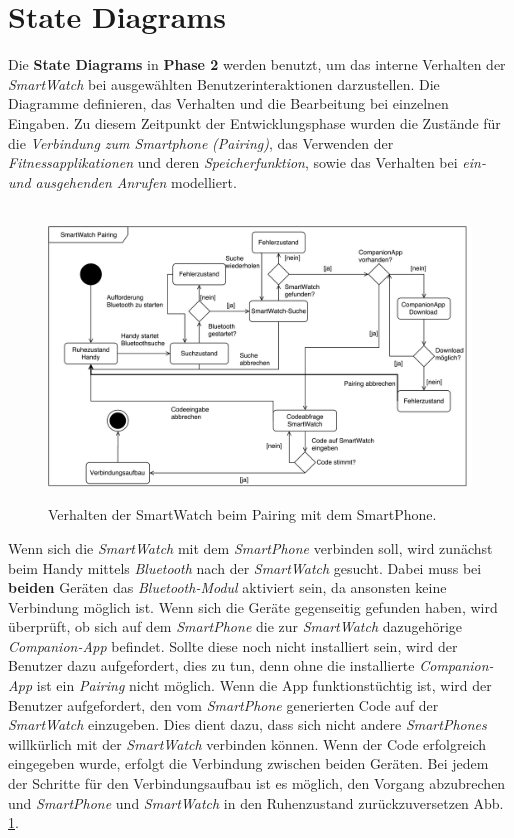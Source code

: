 \section{State Diagrams}
Die \textbf{State Diagrams} in \textbf{Phase 2} werden benutzt, um das interne Verhalten der \textit{SmartWatch} bei ausgewählten Benutzerinteraktionen darzustellen. Die Diagramme definieren, das Verhalten und die Bearbeitung bei einzelnen Eingaben. Zu diesem Zeitpunkt der Entwicklungsphase wurden die Zustände für die \textit{Verbindung zum Smartphone} \textit{(Pairing)}, das Verwenden der \textit{Fitnessapplikationen} und deren \textit{Speicherfunktion}, sowie das Verhalten bei \textit{ein- und ausgehenden Anrufen} modelliert.\\
\begin{figure}[h]
\centering\
\includegraphics[width=\textwidth]{img/statePairing}
\caption[State Diagram: Pairing]{Verhalten der SmartWatch beim Pairing mit dem SmartPhone.}
\label{fig:statePairing}
\end{figure}
Wenn sich die \textit{SmartWatch} mit dem \textit{SmartPhone} verbinden soll, wird zunächst beim Handy mittels \textit{Bluetooth} nach der \textit{SmartWatch} gesucht. Dabei muss bei \textbf{beiden} Geräten das \textit{Bluetooth-Modul} aktiviert sein, da ansonsten keine Verbindung möglich ist. Wenn sich die Geräte gegenseitig gefunden haben, wird überprüft, ob sich auf dem \textit{SmartPhone} die zur \textit{SmartWatch} dazugehörige \textit{Companion-App} befindet. Sollte diese noch nicht installiert sein, wird der Benutzer dazu aufgefordert, dies zu tun, denn ohne die installierte \textit{Companion-App} ist ein \textit{Pairing} nicht möglich. Wenn die App funktionstüchtig ist, wird der Benutzer aufgefordert, den vom \textit{SmartPhone} generierten Code auf der \textit{SmartWatch} einzugeben. Dies dient dazu, dass sich nicht andere \textit{SmartPhones} willkürlich mit der \textit{SmartWatch} verbinden können. Wenn der Code erfolgreich eingegeben wurde, erfolgt die Verbindung zwischen beiden Geräten. Bei jedem der Schritte für den Verbindungsaufbau ist es möglich, den Vorgang abzubrechen und \textit{SmartPhone} und \textit{SmartWatch} in den Ruhenzustand zurückzuversetzen Abb. \ref{fig:statePairing}.\\
